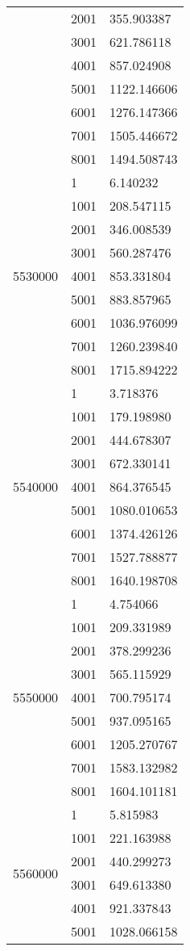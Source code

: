 \begin{table}[htb!]
\begin{tabular}{lll}
 & 2001 & 355.903387 \\
 & 3001 & 621.786118 \\
 & 4001 & 857.024908 \\
 & 5001 & 1122.146606 \\
 & 6001 & 1276.147366 \\
 & 7001 & 1505.446672 \\
 & 8001 & 1494.508743 \\
\multirow[c]{9}{*}{5530000} & 1 & 6.140232 \\
 & 1001 & 208.547115 \\
 & 2001 & 346.008539 \\
 & 3001 & 560.287476 \\
 & 4001 & 853.331804 \\
 & 5001 & 883.857965 \\
 & 6001 & 1036.976099 \\
 & 7001 & 1260.239840 \\
 & 8001 & 1715.894222 \\
\multirow[c]{9}{*}{5540000} & 1 & 3.718376 \\
 & 1001 & 179.198980 \\
 & 2001 & 444.678307 \\
 & 3001 & 672.330141 \\
 & 4001 & 864.376545 \\
 & 5001 & 1080.010653 \\
 & 6001 & 1374.426126 \\
 & 7001 & 1527.788877 \\
 & 8001 & 1640.198708 \\
\multirow[c]{9}{*}{5550000} & 1 & 4.754066 \\
 & 1001 & 209.331989 \\
 & 2001 & 378.299236 \\
 & 3001 & 565.115929 \\
 & 4001 & 700.795174 \\
 & 5001 & 937.095165 \\
 & 6001 & 1205.270767 \\
 & 7001 & 1583.132982 \\
 & 8001 & 1604.101181 \\
\multirow[c]{9}{*}{5560000} & 1 & 5.815983 \\
 & 1001 & 221.163988 \\
 & 2001 & 440.299273 \\
 & 3001 & 649.613380 \\
 & 4001 & 921.337843 \\
 & 5001 & 1028.066158 \\

\end{tabular}
\end{table}
